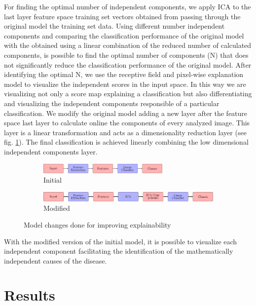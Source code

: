 \documentclass{llncs}
\begin{document}
For finding the optimal number of independent components, we apply ICA to the last layer feature space training set vectors obtained from passing through the original model the training set data. Using different number independent components and comparing the classification performance of the original model with the obtained using a linear combination of the reduced number of calculated components, is possible to find the optimal number of components (N) that does not significantly reduce the classification performance of the original model. After identifying the optimal N, we use the receptive field and pixel-wise explanation model to visualize the independent scores in the input space. In this way we are visualizing not only a score map explaining a classification but also differentiating and visualizing the independent components responsible of a particular classification. We modify the original model adding a new layer after the feature space last layer to calculate online the components of every analyzed image. This layer is a linear transformation and acts as a dimensionality reduction layer (see fig. \ref{fig:models}). The final classification is achieved linearly combining the low dimensional independent components layer.

\begin{figure}[h!]
	\centering
	\begin{subfigure}[b]{\textwidth}
		\centering
		\includegraphics[width=0.7\textwidth]{./figures/initial_classifier.pdf}
		\caption{Initial}	
	\end{subfigure}
	\hfill   
	\begin{subfigure}[b]{\textwidth}
		\centering
		\includegraphics[width=\textwidth]{./figures/ica_classifier.pdf}
		\caption{Modified}
	\end{subfigure}
	\caption{Model changes done for improving explainability}  
	\label{fig:models} 
\end{figure}


With the modified version of the initial model, it is possible to visualize each independent component facilitating the identification of the mathematically independent causes of the disease.

\section{Results}\label{sec:results}
\end{document}
